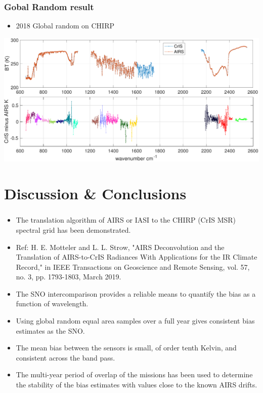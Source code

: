 \documentclass[10pt,t]{beamer}
\begin{document}
\begin{frame}
  \frametitle{Gobal Random result}
  \begin{itemize}
    \item 2018 Global random on CHIRP
  \end{itemize}
  
  \begin{center}
    \includegraphics[width=\linewidth]{./Figs/Pdf/ac_global_random_fs_bias_mean.pdf}
  \end{center}

\end{frame}

\section{Discussion \& Conclusions}
\begin{frame}
  \frametitle{}
  \begin{itemize}
  \item The translation algorithm of AIRS or IASI to the CHIRP (CrIS MSR) spectral grid has been demonstrated.
  \item Ref: H. E. Motteler and L. L. Strow, "AIRS Deconvolution and the Translation of AIRS-to-CrIS Radiances With Applications for the IR Climate Record," in IEEE Transactions on Geoscience and Remote Sensing, vol. 57, no. 3, pp. 1793-1803, March 2019.
  \item The SNO intercomparison provides a reliable means to quantify the bias as a function of wavelength.
    \item Using global random equal area samples over a full year gives consistent bias estimates as the SNO.
    \item The mean bias between the sensors is small, of order tenth Kelvin, and consistent across the band pass.
    \item The multi-year period of overlap of the missions has been used to determine the stability of the bias estimates with values close to the known AIRS drifts.
    
  \end{itemize}

\end{frame}

\end{document}
